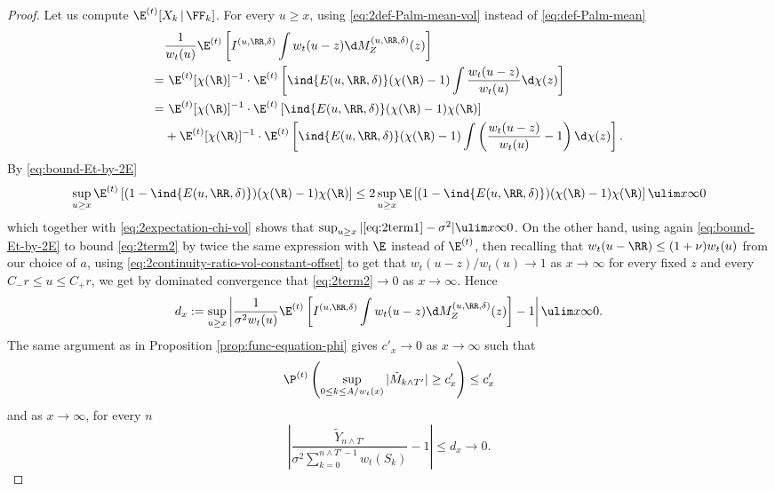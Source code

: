 \documentclass[10pt,a4paper]{article}
\begin{document}
\begin{proof}
Let us compute $\E^{(t)}[X_k \, | \, \FF_{k}]$. 
For every $u\geq x$, using \eqref{eq:2def-Palm-mean-vol} instead of \eqref{eq:def-Palm-mean} 
\begin{align}
\nonumber & \frac{1}{w_t(u)}\E^{(t)}\left[ I^{(u,\RR,\delta)} \int w_t(u-z) \d M_{Z}^{(u, \RR, \delta)}(z) \right] \\
\nonumber =& \ \E^{(t)}[\chi(\R)]^{-1} \cdot \E^{(t)}\left[ \ind{E(u,\RR,\delta)} (\chi(\R)-1)\int \frac{w_t(u-z)}{w_t(u)} \d\chi(z) \right] \\
=& \ \E^{(t)}[\chi(\R)]^{-1} \cdot \E^{(t)}\left[ \ind{E(u,\RR,\delta)} (\chi(\R)-1)\chi(\R) \right] \label{eq:2term1} \\
&+ \E^{(t)}[\chi(\R)]^{-1} \cdot \E^{(t)}\left[ \ind{E(u,\RR,\delta)} (\chi(\R)-1)\int \left(\frac{w_t(u-z)}{w_t(u)}-1\right) \d\chi(z) \right] . \label{eq:2term2}
\end{align}
By \eqref{eq:bound-Et-by-2E}
\[ \sup_{u\geq x} \E^{(t)}\left[ (1-\ind{E(u,\RR,\delta)}) (\chi(\R)-1)\chi(\R) \right] \leq 2 \sup_{u\geq x} \E\left[ (1-\ind{E(u,\RR,\delta)}) (\chi(\R)-1)\chi(\R) \right] \ulim x \infty 0 \]
which together with \eqref{eq:2expectation-chi-vol} shows that 
$\sup_{u\geq x} |\eqref{eq:2term1}-\sigma^2| \ulim x \infty 0$.
On the other hand, using again \eqref{eq:bound-Et-by-2E} to bound \eqref{eq:2term2} by twice the same expression with $\E$ instead of $\E^{(t)}$, then recalling that $w_t(u-\RR) \leq (1+\nu) w_t(u)$ from our choice of $a$, using \eqref{eq:2continuity-ratio-vol-constant-offset} to get that $w_t(u-z) / w_t(u) \to 1$ as $x\to\infty$ for every fixed $z$ and every $C_- r \leq u \leq C_+ r$, we get by dominated convergence that \eqref{eq:2term2}$\to 0$ as $x\to\infty$. 
Hence 
\begin{equation}
d_x := \sup_{u\geq x} \left|\frac{1}{\sigma^2 w_t(u)} \E^{(t)}\left[ I^{(u,\RR,\delta)} \int w_t(u-z) \d M_{Z}^{(u, \RR, \delta)}(z) \right] - 1\right| \ulim x \infty 0 . 
\end{equation}
The same argument as in Proposition \ref{prop:func-equation-phi} 
gives $c'_x\to 0$ as $x\to\infty$ such that 
\begin{equation}\label{eq:2controle-Z-2-vol}
\P^{(t)}\left( \sup_{0\leq k \leq A/w_t(x)} |\tilde M_{k\wedge T'}| \geq c'_x \right) \leq c'_x 
\end{equation}
and as $x\to\infty$, for every $n$
\begin{equation}\label{eq:2controle-Z-3-vol}
\left| \frac{\tilde Y_{n\wedge T'}}{\sigma^2 \sum_{k=0}^{n\wedge T'-1} w_t(S_k)} - 1 \right| \leq d_x \to 0 .

\end{equation}
\end{proof}
\end{document}
